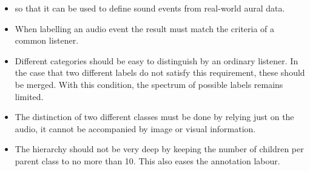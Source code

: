 \begin{itemize}
	\item {} so that it can be used to define sound events from real-world aural data.
	\item When labelling an audio event the result must match the criteria of a common listener.
	\item Different categories should be easy to distinguish by an ordinary listener. In the case that two different labels do not satisfy this requirement, these should be merged. With this condition, the spectrum of possible labels remains limited.
	\item The distinction of two different classes must be done by relying just on the audio, it cannot be accompanied by image or visual information.
	\item The hierarchy should not be very deep by keeping the number of children per parent class to no more than 10. This also eases the annotation labour. 
\end{itemize}
